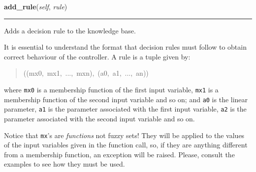     \label{peach:fuzzy:control:Parametric:add_rule}

    \vspace{0.5ex}

\hspace{.8\funcindent}\begin{boxedminipage}{\funcwidth}

    \raggedright \textbf{add\_rule}(\textit{self}, \textit{rule})

    \vspace{-1.5ex}

    \rule{\textwidth}{0.5\fboxrule}
\setlength{\parskip}{2ex}

Adds a decision rule to the knowledge base.

It is essential to understand the format that decision rules must follow
to obtain correct behaviour of the controller. A rule is a tuple given
by:
%
\begin{quote}{\ttfamily \raggedright \noindent
((mx0,~mx1,~...,~mxn),~(a0,~a1,~...,~an))
}
\end{quote}

where \texttt{mx0} is a membership function of the first input variable,
\texttt{mx1} is a membership function of the second input variable and so on;
and \texttt{a0} is the linear parameter, \texttt{a1} is the parameter associated
with the first input variable, \texttt{a2} is the parameter associated with
the second input variable and so on.

Notice that \texttt{mx}'s are \emph{functions} not fuzzy sets! They will be
applied to the values of the input variables given in the function call,
so, if they are anything different from a membership function, an
exception will be raised. Please, consult the examples to see how they
must be used.
\setlength{\parskip}{1ex}
    \end{boxedminipage}

    \label{peach:fuzzy:control:Parametric:eval}

    \vspace{0.5ex}

